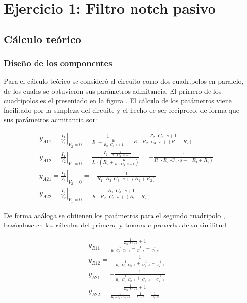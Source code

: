 

\section{Ejercicio 1: Filtro notch pasivo}
\subsection{C\'alculo te\'orico}
\subsubsection{Dise\~no de los componentes}
Para el c\'alculo te\'orico se consider\'o al circuito como dos cuadripolos en paralelo, de los cuales se obtuvieron sus par\'ametros admitancia.
El primero de los cuadripolos es el presentado en la figura .
El c\'alculo de los par\'ametros viene facilitado por la simpleza del circuito y el hecho de ser rec\'iproco, de forma que sus par\'ametros admitancia son:

\begin{align}
    \label{eqn: Admittance parameters first quadrupole.}
    y_{A11} = \left. \frac{I_1}{V_1} \right\rvert_{V_2=0} = \frac{1}{R_1 + \frac{R_2}{R_2 \cdot C_3 \cdot s + 1}} = \frac{R_2 \cdot C_3 \cdot s + 1}{R_1 \cdot R_2 \cdot C_3 \cdot s + \left(R_1+R_2\right)} \\
    y_{A12} = \left. \frac{I_1}{V_2} \right\rvert_{V_1=0} = \frac{-I_2 \cdot \frac{1}{R_1 \cdot C_3 \cdot s + 1}}{I_2 \cdot \left(R_2 + \frac{R_1}{R_1 \cdot C_3 \cdot s + 1}\right)} = -\frac{1}{R_1 \cdot R_2 \cdot C_3 \cdot s + \left(R_1+R_2\right)}\\
    y_{A21} = \left. \frac{I_2}{V_1} \right\rvert_{V_2=0} = -\frac{1}{R_1 \cdot R_2 \cdot C_3 \cdot s + \left(R_1+R_2\right)}\\
    y_{A22} = \left. \frac{I_2}{V_2} \right\rvert_{V_1=0} = \frac{R_1 \cdot C_3 \cdot s + 1}{R_1 \cdot R_2 \cdot C_3 \cdot s + \left(R_1+R_2\right)}
\end{align}

De forma an\'aloga se obtienen los par\'ametros para el segundo cuadripolo , bas\'andose en los c\'alculos del primero, y tomando provecho de su similitud.

\begin{align}
    \label{eqn: Admittance parameters second quadrupole.}
    y_{B11} = \frac{\frac{1}{R_3 \cdot C_2 \cdot s} + 1}{\frac{1}{R_3 \cdot C_1 \cdot C_2 \cdot s} + \frac{1}{C_1 \cdot s} + \frac{1}{C_2 \cdot s}} \\
    y_{B12} = -\frac{1}{\frac{1}{R_3 \cdot C_1 \cdot C_2 \cdot s} + \frac{1}{C_1 \cdot s} + \frac{1}{C_2 \cdot s}}\\
    y_{B21} = -\frac{1}{\frac{1}{R_3 \cdot C_1 \cdot C_2 \cdot s} + \frac{1}{C_1 \cdot s} + \frac{1}{C_2 \cdot s}}\\
    y_{B22} = \frac{\frac{1}{R_3 \cdot C_1 \cdot s} + 1}{\frac{1}{R_3 \cdot C_1 \cdot C_2 \cdot s} + \frac{1}{C_1 \cdot s} + \frac{1}{C_2 \cdot s}}
\end{align}

